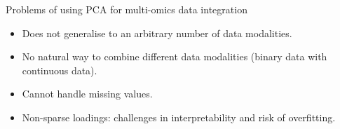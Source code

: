 \documentclass[aspectratio=169,notes]{beamer}
\begin{document}


	
	\begin{frame}{Problems of using PCA for multi-omics data integration}
	\begin{itemize}
		\item Does not generalise to an arbitrary number of data modalities.
		\item No natural way to combine different data modalities (binary data with continuous data).
		\item Cannot handle missing values.
		\item Non-sparse loadings: challenges in interpretability and risk of overfitting.
	\end{itemize}
	\end{frame}
\end{document}
